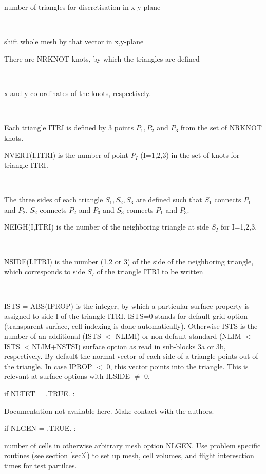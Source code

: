 \begin{list}{ }{}
\item[{\bf NR1ST }]
number of triangles for discretisation in x-y plane
\item[{\bf XPCOR,YPCOR }] ~

shift whole mesh by that vector in x,y-plane
\item[{\bf NRKNOT }]
There are NRKNOT knots, by which the triangles are defined
\item[{\bf XTRIAN,YTRIAN }] ~

x and y co-ordinates of the knots, respectively.
\item[{\bf NVERT(I,ITRI) }] ~

Each triangle ITRI is defined by 3 points $P_1, P_2$ and $P_3$ from
the set of NRKNOT knots.

NVERT(I,ITRI) is the number of
point $P_I$ (I=1,2,3) in the set of knots for triangle ITRI.
\item[{\bf NEIGH(I,ITRI) }] ~

The three sides of each triangle $S_1, S_2, S_3$ are defined such that
$S_1$ connects $P_1$ and $P_2$, $S_2$ connects $P_2$ and $P_3$ and $S_3$
connects $P_1$ and $P_3$.

NEIGH(I,ITRI) is the number of the neighboring triangle at side $S_I$
for I=1,2,3.
\item[{\bf NSIDE(I,ITRI) }] ~

NSIDE(I,ITRI) is the number (1,2 or 3) of the side of the neighboring
triangle, which corresponds to side $S_I$ of the triangle ITRI
to be written
\item[{\bf IPROP(I,ITRI) }] ~

ISTS = ABS(IPROP) is the integer, by which a
particular surface property is assigned to
side I of the triangle ITRI. ISTS=0 stands for default grid option (transparent
surface, cell indexing is done automatically). Otherwise ISTS is the number of
an additional (ISTS $<$ NLIMI) or non-default standard (NLIM $<$ ISTS $<$NLIM+NSTSI)
surface option as read in sub-blocks 3a or 3b, respectively.
By default the normal vector of each side of a triangle points out of the triangle.
In case IPROP $<$ 0, this vector points into the triangle.
This is relevant at surface options with ILSIDE $\not=$ 0.
\end{list}
if NLTET = .TRUE. :

Documentation not available here. Make contact with the authors.

if NLGEN = .TRUE. :
\begin{list}{ }{}
\item[{\bf NR1ST }]

number of cells in otherwise arbitrary mesh option NLGEN.
Use problem specific routines (see section \ref{sec3})
to set up mesh, cell volumes, and flight interesction times for test partilces.
\end{list}

